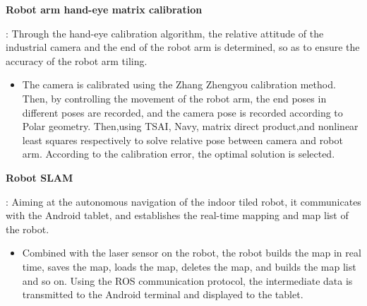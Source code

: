\documentclass[CJK]{article}
\newcommand{\resumeItem}[2]{
  \item\small{
    \textbf{#1}{: #2 \vspace{-2pt}}
  }
}
\begin{document}
\begin{CJK}{UTF8}{gkai}
          \resumeItem{\normalsize Robot arm hand-eye matrix calibration}
          { Through the hand-eye calibration algorithm, the relative attitude of the industrial camera and the end of the robot arm is determined, so as to ensure the accuracy of the robot arm tiling.
            \begin{itemize}
                \item %
                The camera is calibrated using the Zhang Zhengyou calibration method. Then, by controlling the movement of the robot arm, the end poses in different poses are recorded, and the camera pose is recorded according to Polar geometry. Then,using  TSAI, Navy, matrix direct product,and nonlinear least squares respectively to solve relative pose between camera and robot arm. According to the calibration error, the optimal solution is selected.
            \end{itemize}
          }
          \resumeItem{\normalsize Robot SLAM}%
          {%
          Aiming at the autonomous navigation of the indoor tiled robot, it communicates with the Android tablet, and establishes the real-time mapping and map list of the robot.
            \begin{itemize}
                \item %
                Combined with the laser sensor on the robot, the robot builds the map in real time, saves the map, loads the map, deletes the map, and builds the map list and so on. Using the ROS communication protocol, the intermediate data is transmitted to the Android terminal and displayed to the tablet.
            \end{itemize}
}
\end{CJK}
\end{document}

